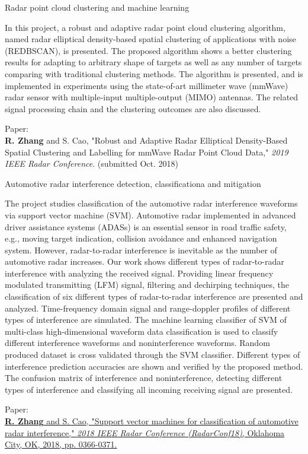 \documentclass[letterpaper,9pt]{article}
\renewenvironment{itemize}{
  \begin{list}{}{
    \setlength{\topsep}{0pt}
    \setlength{\itemsep}{0pt}
    \setlength{\parsep}{0pt}
    \setlength{\partopsep}{0pt}
    \setlength{\leftmargin}{1.5em}
  }
}{\end{list}}
\begin{document}
\begin{itemize}
  \item Radar point cloud clustering and machine learning
  \begin{itemize}
    \item [$\bullet$] In this project, a robust and adaptive radar point cloud clustering algorithm, named radar elliptical density-based spatial clustering of applications with noise (REDBSCAN), is presented. The proposed algorithm shows a better clustering results for adapting to arbitrary shape of targets as well as any number of targets comparing with traditional clustering methods. The algorithm is presented, and is implemented in experiments using the state-of-art millimeter wave (mmWave) radar sensor with multiple-input multiple-output (MIMO) antennas. The related signal processing chain and the clustering outcomes are also discussed.
    \item [$\bullet$] Paper: \\
    {\bf R. Zhang} and S. Cao, "Robust and Adaptive Radar Elliptical Density-Based Spatial Clustering and Labelling for mmWave Radar Point Cloud Data," {\it 2019 IEEE Radar Conference}. (submitted Oct. 2018)
  \end{itemize}

  

  \item Automotive radar interference detection, classificationa and mitigation
  \begin{itemize}
    \item [$\bullet$] The project studies classification of the automotive radar interference waveforms via support vector machine (SVM). Automotive radar implemented in advanced driver assistance systems (ADASs) is an essential sensor in road traffic safety, e.g., moving target indication, collision avoidance and enhanced navigation system. However, radar-to-radar interference is inevitable as the number of automotive radar increases. Our work shows different types of radar-to-radar interference with analyzing the received signal. Providing linear frequency modulated transmitting (LFM) signal, filtering and dechirping techniques, the classification of six different types of radar-to-radar interference are presented and analyzed. Time-frequency domain signal and range-doppler profiles of different types of interference are simulated. The machine learning classifier of SVM of multi-class high-dimensional waveform data classification is used to classify different interference waveforms and noninterference waveforms. Random produced dataset is cross validated through the SVM classifier. Different types of interference prediction accuracies are shown and verified by the proposed method. The confusion matrix of interference and noninterference, detecting different types of interference and classifying all incoming receiving signal are presented.
    \item [$\bullet$] Paper: \\
    \href{https://ieeexplore.ieee.org/abstract/document/8378586/}{{\bf R. Zhang} and S. Cao, "Support vector machines for classification of automotive radar interference," {\it 2018 IEEE Radar Conference (RadarConf18)}, Oklahoma City, OK, 2018, pp. 0366-0371.}
  \end{itemize}


\end{itemize}
\end{document}
